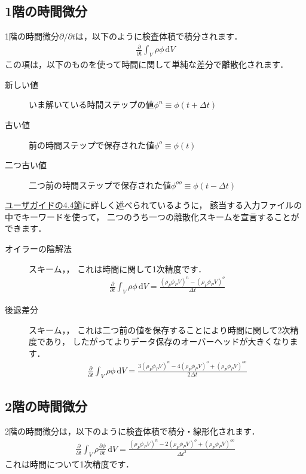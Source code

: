 \subsection{1階の時間微分}
\label{ssec:2.4.3}
1階の時間微分$\partial/\partial t$は，以下のように検査体積で積分されます．
\begin{align}
 \label{eq:2.20}
 \frac{\partial}{\partial t}\int_{V}\rho\phi\,\mathrm{d}V
\end{align}
この項は，以下のものを使って時間に関して単純な差分で離散化されます．
\begin{description}
 \item[新しい値] いま解いている時間ステップの値$\phi^{n} \equiv \phi(t + \Delta t)$
 \item[古い値] 前の時間ステップで保存された値$\phi^{o} \equiv \phi(t)$
 \item[二つ古い値] 二つ前の時間ステップで保存された値$\phi^{oo} \equiv \phi(t - \Delta t)$
\end{description}
\href{UserGuideJa.pdf#section.4.4}{ユーザガイドの4.4節}に詳しく述べられているように，
該当する入力ファイルの中でキーワードを使って，
二つのうち一つの離散化スキームを宣言することができます．
\begin{description}
 \item[オイラーの陰解法] スキーム，，
            これは時間に関して1次精度です．
            \begin{align}
             \label{eq:2.21}
             \frac{\partial}{\partial t}\int_{V}\rho\phi\,\mathrm{d}V
             = \frac{(\rho_{P}\phi_{P}V)^{n} - (\rho_{P}\phi_{P}V)^{o}}{\Delta t}
            \end{align}
 \item[後退差分] スキーム，，
            これは二つ前の値を保存することにより時間に関して2次精度であり，
            したがってよりデータ保存のオーバーヘッドが大きくなります．
            \begin{align}
             \label{eq:2.22}
             \frac{\partial}{\partial t}\int_{V}\rho\phi\,\mathrm{d}V
             = \frac{3(\rho_{P}\phi_{P}V)^{n} - 4(\rho_{P}\phi_{P}V)^{o}
             + (\rho_{P}\phi_{P}V)^{oo}}{2\Delta t}
            \end{align}
\end{description}


\subsection{2階の時間微分}
\label{ssec:2.4.4}
2階の時間微分は，以下のように検査体積で積分・線形化されます．
\begin{align}
 \label{eq:2.23}
 \frac{\partial}{\partial t}\int_{V}\rho\frac{\partial\phi}{\partial t}\,\mathrm{d}V
 = \frac{(\rho_{P}\phi_{P}V)^{n} - 2(\rho_{P}\phi_{P}V)^{o}
 + (\rho_{P}\phi_{P}V)^{oo}}{\Delta t^{2}}
\end{align}
これは時間について1次精度です．



